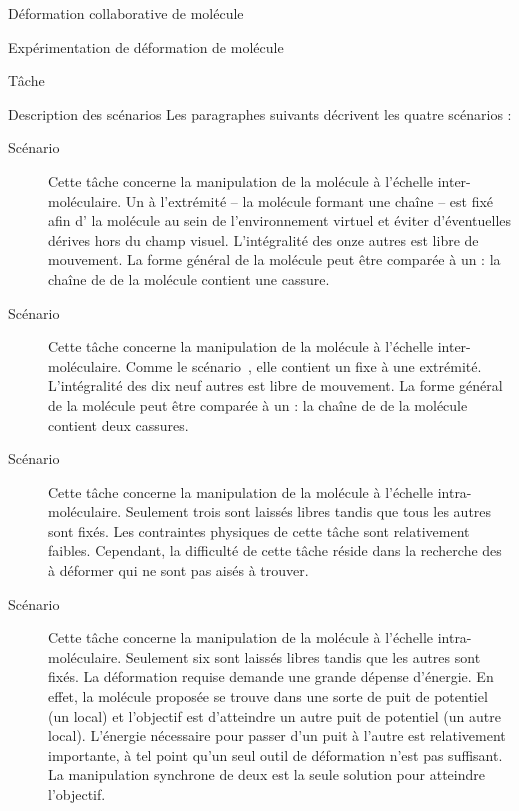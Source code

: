 \documentclass[myfrancais]{mythesis}
\begin{document}
\begin{mychapter}{Déformation collaborative de molécule}
\begin{mysection}{Expérimentation de déformation de molécule}
\begin{mysubsection}{Tâche}
\begin{mysubsubsection}{Description des scénarios}
					Les paragraphes suivants décrivent les quatre scénarios :
					\begin{description}
						\item[Scénario~]
							Cette tâche concerne la manipulation de la molécule \myTRPZIPPER à l'échelle inter-moléculaire.
							Un  à l'extrémité -- la molécule formant une chaîne -- est fixé afin d' la molécule au sein de l'environnement virtuel et éviter d'éventuelles dérives hors du champ visuel.
							L'intégralité des onze autres  est libre de mouvement.
							La forme général de la molécule peut être comparée à un  : la chaîne de  de la molécule contient une cassure.
						\item[Scénario~]
							Cette tâche concerne la manipulation de la molécule \myTRPCAGE à l'échelle inter-moléculaire.
							Comme le scénario~, elle contient un  fixe à une extrémité.
							L'intégralité des dix neuf autres  est libre de mouvement.
							La forme général de la molécule peut être comparée à un  : la chaîne de  de la molécule contient deux cassures.
						\item[Scénario~]
							Cette tâche concerne la manipulation de la molécule \myTRPZIPPER à l'échelle intra-moléculaire.
							Seulement trois  sont laissés libres tandis que tous les autres sont fixés.
							Les contraintes physiques de cette tâche sont relativement faibles.
							Cependant, la difficulté de cette tâche réside dans la recherche des  à déformer qui ne sont pas aisés à trouver.
						\item[Scénario~]
							Cette tâche concerne la manipulation de la molécule \myTRPCAGE à l'échelle intra-moléculaire.
							Seulement six  sont laissés libres tandis que les autres sont fixés.
							La déformation requise demande une grande dépense d'énergie.
							En effet, la molécule proposée se trouve dans une sorte de puit de potentiel (un  local) et l'objectif est d'atteindre un autre puit de potentiel (un autre  local).
							L'énergie nécessaire pour passer d'un puit à l'autre est relativement importante, à tel point qu'un seul outil de déformation n'est pas suffisant.
							La manipulation synchrone de deux  est la seule solution pour atteindre l'objectif.
					\end{description}


\end{mysubsubsection}
\end{mysubsection}
\end{mysection}
\end{mychapter}
\end{document}

